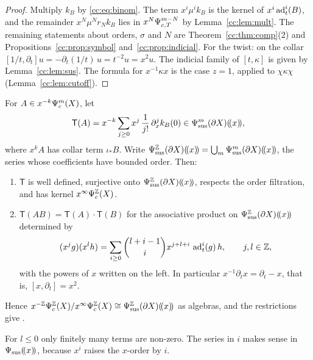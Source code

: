\begin{proof}
Multiply \(k_B\) by \eqref{cc:eq:binom}. The term \(x^i\mu^ik_B\) is the
kernel of \(x^i\operatorname{ad}_t^i(B)\), and the remainder
\(x^N\mu^Nr_Nk_B\) lies in \(x^N\Psi_{c,T}^{m-N}\) by
Lemma~\ref{cc:lem:mult}. The remaining statements about orders,
\(\sigma\) and \(N\) are Theorem~\ref{cc:thm:comp}(2) and
Propositions~\ref{cc:prop:symbol} and~\ref{cc:prop:indicial}. For the
twist: on the collar \([1/t,\partial_t]u=-\partial_t(1/t)\,u=t^{-2}u=
x^2u\). The indicial family of \([t,\kappa]\) is given by
Lemma~\ref{cc:lem:sus}. The formula for \(x^{-1}\kappa x\) is the case
\(z=1\), applied to \(\chi\kappa\chi\) (Lemma~\ref{cc:lem:cutoff}).
\end{proof}

\begin{proposition}
\label{cc:prop:taylor}
For \(A\in x^{-k}\Psi_{c}^m(X)\), let
\[
 \mathsf T(A)=x^{-k}\sum_{j\ge0}x^j\,\frac1{j!}\,\partial_x^jk_{B}(0)
 \in\Psi_{\mathrm{sus}}^m(\partial X)(\!(x)\!),
\]
where \(x^kA\) has collar term \(\iota_*B\). Write
\(\Psi_{\mathrm{sus}}^{\mathbb Z}(\partial X)(\!(x)\!)=\bigcup_m\Psi_{\mathrm{sus}}^m(\partial X)(\!(x)\!)\),
the series whose coefficients have bounded order. Then:
\begin{enumerate}
\item \(\mathsf T\) is well defined, surjective onto
\(\Psi_{\mathrm{sus}}^{\mathbb Z}(\partial X)(\!(x)\!)\), respects the order filtration, and has
kernel \(x^\infty\Psi_{c}^{\mathbb Z}(X)\).
\item \(\mathsf T(AB)=\mathsf T(A)\cdot\mathsf T(B)\) for the associative
product on \(\Psi_{\mathrm{sus}}^{\mathbb Z}(\partial X)(\!(x)\!)\) determined by
\[
 (x^jg)(x^lh)=\sum_{i\ge0}\binom{l+i-1}{i}x^{j+l+i}\,\operatorname{ad}_t^i(g)\,h,
 \qquad j,l\in\mathbb Z ,
\]
with the powers of \(x\) written on the left. In particular
\(x^{-1}\partial_tx=\partial_t-x\), that is, \([x,\partial_t]=x^2\).
\end{enumerate}
Hence \(x^{-\mathbb Z}\Psi_{c}^{\mathbb Z}(X)/x^\infty\Psi_{c}^{\mathbb Z}(X)\cong
\Psi_{\mathrm{sus}}^{\mathbb Z}(\partial X)(\!(x)\!)\) as algebras, and the restrictions give
\cite[(14)]{MN}.
\end{proposition}

For \(l\le0\) only finitely many terms are non-zero. The series in
\(i\) makes sense in \(\Psi_{\mathrm{sus}}(\!(x)\!)\), because \(x^i\) raises the
\(x\)-order by \(i\).

